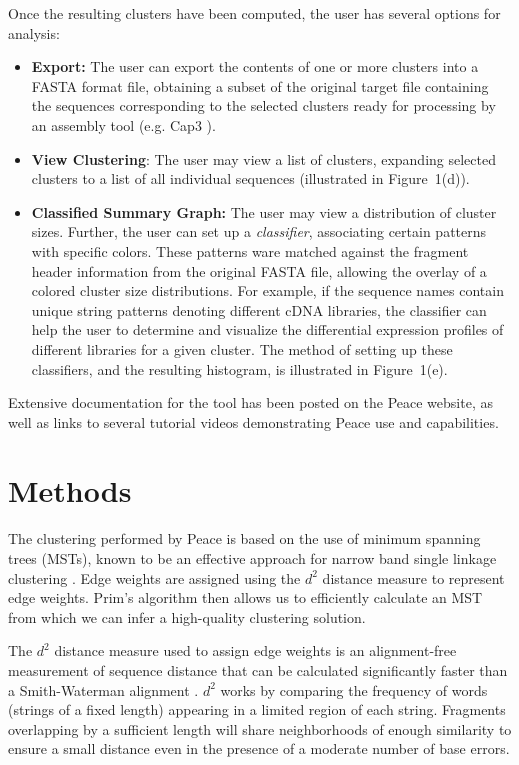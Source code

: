 \documentclass[a4,center,fleqn]{NAR}
\begin{document}
 Once the resulting clusters have been
computed, the user has several options for analysis:
\begin{itemize}
\item {\bf Export:} The user can export the contents of one or more
  clusters into a FASTA format file, obtaining a subset of the original target file
  containing the sequences corresponding to the selected clusters
  ready for processing by an assembly tool (e.g. {\sc Cap3} \cite{Huang99}).
\item {\bf View Clustering}: The user may view a list of clusters,
  expanding selected clusters to a list of all individual sequences (illustrated
  in Figure~1(d)).
\item {\bf Classified Summary Graph:} The user may view a distribution
  of cluster sizes.  Further, the user can set up a {\it classifier},
  associating certain patterns with specific colors.  These patterns
  ware matched against the fragment header information from the
  original FASTA file, allowing the overlay of a colored cluster size
  distributions.  For example, if the sequence names contain unique
  string patterns denoting different cDNA libraries, the classifier
  can help the user to determine and visualize the differential expression profiles
  of different libraries for a given cluster.  The method of setting up these classifiers, and the
  resulting histogram, is illustrated in Figure~1(e).
\end{itemize}
Extensive documentation for the tool has been posted on the {\sc
  Peace} website, as well as links to several tutorial videos demonstrating
{\sc Peace} use and capabilities.


\section{Methods}

The clustering performed by {\sc Peace} is based on the use of minimum
spanning trees (MSTs), known to be an effective approach for narrow
band single linkage clustering \cite{Jain99,Wan08}. Edge weights are
assigned using the $d^2$ distance measure \cite{Hide94} to represent
edge weights.  Prim's algorithm \cite{Prim57} then allows us to
efficiently calculate an MST from which we can infer a high-quality
clustering solution.

The $d^2$ distance measure used to assign edge weights is an
alignment-free measurement of sequence distance that can be calculated
significantly faster than a Smith-Waterman alignment \cite{Hide94}.
$d^2$ works by comparing the frequency of words (strings of a fixed
length) appearing in a limited region of each string.  Fragments
overlapping by a sufficient length will share neighborhoods of enough
similarity to ensure a small distance even in the presence of a
moderate number of base errors.
\end{document}
